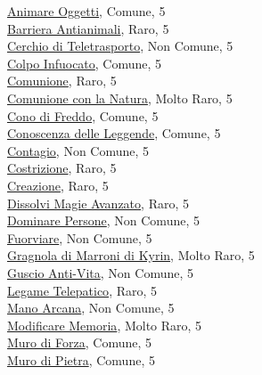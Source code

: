 \begin{multicols}{3}
{{\hyperlink{Animare Oggetti}{Animare Oggetti}, Comune, 5\\
\hyperlink{Barriera Antianimali}{Barriera Antianimali}, Raro, 5\\
\hyperlink{Cerchio di Teletrasporto}{Cerchio di Teletrasporto}, Non Comune, 5\\
\hyperlink{Colpo Infuocato}{Colpo Infuocato}, Comune, 5\\
\hyperlink{Comunione}{Comunione}, Raro, 5\\
\hyperlink{Comunione con la Natura}{Comunione con la Natura}, Molto Raro, 5\\
\hyperlink{Cono di Freddo}{Cono di Freddo}, Comune, 5\\
\hyperlink{Conoscenza delle Leggende}{Conoscenza delle Leggende}, Comune, 5\\
\hyperlink{Contagio}{Contagio}, Non Comune, 5\\
\hyperlink{Costrizione}{Costrizione}, Raro, 5\\
\hyperlink{Creazione}{Creazione}, Raro, 5\\
\hyperlink{Dissolvi Magie Avanzato}{Dissolvi Magie Avanzato}, Raro, 5\\
\hyperlink{Dominare Persone}{Dominare Persone}, Non Comune, 5\\
\hyperlink{Fuorviare}{Fuorviare}, Non Comune, 5\\
\hyperlink{Gragnola di Marroni di Kyrin}{Gragnola di Marroni di Kyrin}, Molto Raro, 5\\
\hyperlink{Guscio Anti-Vita}{Guscio Anti-Vita}, Non Comune, 5\\
\hyperlink{Legame Telepatico}{Legame Telepatico}, Raro, 5\\
\hyperlink{Mano Arcana}{Mano Arcana}, Non Comune, 5\\
\hyperlink{Modificare Memoria}{Modificare Memoria}, Molto Raro, 5\\
\hyperlink{Muro di Forza}{Muro di Forza}, Comune, 5\\
\hyperlink{Muro di Pietra}{Muro di Pietra}, Comune, 5\\
}}
\end{multicols}
